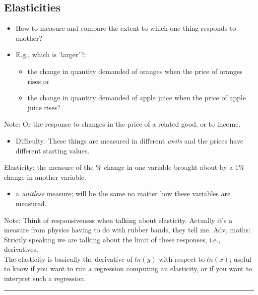\documentclass[]{article}
\providecommand{\tightlist}{%
  \setlength{\itemsep}{0pt}\setlength{\parskip}{0pt}}
\begin{document}
\hypertarget{elasticities}{%
\subsection{Elasticities}\label{elasticities}}

\begin{itemize}
\tightlist
\item
  How to measure and compare the extent to which one thing responds to another?
\item
  E.g., which is `larger'?:

  \begin{itemize}
  \tightlist
  \item
    the change in quantity demanded of oranges when the price of oranges rises or
  \item
    the change in quantity demanded of apple juice when the price of apple juice rises?
  \end{itemize}
\end{itemize}

Note: Or the response to changes in the price of a related good, or to income.

\begin{itemize}
\tightlist
\item
  Difficulty: These things are measured in different \emph{units} and the prices have different starting values.
\end{itemize}

\bigskip

Elasticity: the measure of the \% change in one variable brought about by a 1\% change in another variable.

\begin{itemize}
\tightlist
\item
  a \emph{unitless} measure; will be the same no matter how these variables are measured.
\end{itemize}

Note: Think of responsiveness when talking about elasticity. Actually it's a measure from physics having to do with rubber bands, they tell me.
Adv, maths: Strictly speaking we are talking about the limit of these responses, i.e., derivatives.\\
The elasticity is basically the derivative of \(ln(y)\) with respect to \(ln(x)\); useful to know if you want to run a regression computing an elasticity, or if you want to interpret such a regression.

\begin{center}\rule{0.5\linewidth}{\linethickness}\end{center}
\end{document}

